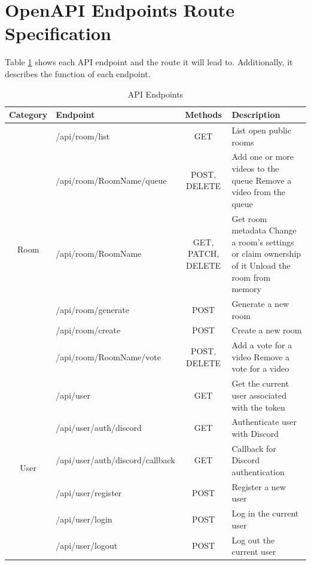 \section{OpenAPI Endpoints Route Specification}

Table \ref{tbl:endpoints} shows each API endpoint and the route it will lead to. Additionally, it describes the function of each endpoint.


\begin{table}[htbp]
  \centering
  \caption{API Endpoints}
  \label{tbl:endpoints}
  \begin{tabular}{|c|l|c|p{5.5cm}|}
    \hline
    \textbf{Category} & \textbf{Endpoint} & \textbf{Methods} & \textbf{Description} \\
    \hline
    \multirow{6}{*}{Room} & /api/room/list & GET & List open public rooms \\
    \cline{2-4}
    & /api/room/{RoomName}/queue & POST, DELETE & Add one or more videos to the queue \newline Remove a video from the queue \\
    \cline{2-4}
    & /api/room/{RoomName} & GET, PATCH, DELETE & Get room metadata \newline Change a room's settings or claim ownership of it \newline Unload the room from memory \\
    \cline{2-4}
    & /api/room/generate & POST & Generate a new room \\
    \cline{2-4}
    & /api/room/create & POST & Create a new room \\
    \cline{2-4}
    & /api/room/{RoomName}/vote & POST, DELETE & Add a vote for a video \newline Remove a vote for a video \\
    \hline
    \multirow{6}{*}{User} & /api/user & GET & Get the current user associated with the token \\
    \cline{2-4}
    & /api/user/auth/discord & GET & Authenticate user with Discord \\
    \cline{2-4}
    & /api/user/auth/discord/callback & GET & Callback for Discord authentication \\
    \cline{2-4}
    & /api/user/register & POST & Register a new user \\
    \cline{2-4}
    & /api/user/login & POST & Log in the current user \\
    \cline{2-4}
    & /api/user/logout & POST & Log out the current user \\

\end{tabular}
\end{table}
